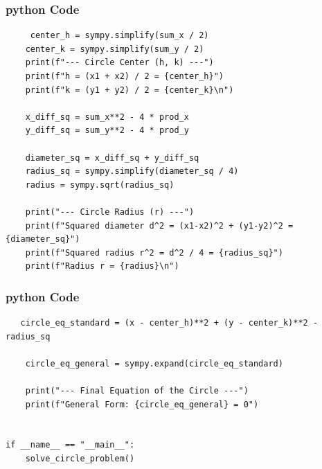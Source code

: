 \documentclass{beamer}
\begin{document}
\begin{frame}[fragile]
    \frametitle{python Code }
    \begin{lstlisting}
     center_h = sympy.simplify(sum_x / 2)
    center_k = sympy.simplify(sum_y / 2)
    print(f"--- Circle Center (h, k) ---")
    print(f"h = (x1 + x2) / 2 = {center_h}")
    print(f"k = (y1 + y2) / 2 = {center_k}\n")
    
    x_diff_sq = sum_x**2 - 4 * prod_x
    y_diff_sq = sum_y**2 - 4 * prod_y
    
    diameter_sq = x_diff_sq + y_diff_sq
    radius_sq = sympy.simplify(diameter_sq / 4)
    radius = sympy.sqrt(radius_sq)

    print("--- Circle Radius (r) ---")
    print(f"Squared diameter d^2 = (x1-x2)^2 + (y1-y2)^2 = {diameter_sq}")
    print(f"Squared radius r^2 = d^2 / 4 = {radius_sq}")
    print(f"Radius r = {radius}\n")

\end{lstlisting}
\end{frame}
\begin{frame}[fragile]
    \frametitle{python Code }
    \begin{lstlisting}
   circle_eq_standard = (x - center_h)**2 + (y - center_k)**2 - radius_sq
    
    circle_eq_general = sympy.expand(circle_eq_standard)

    print("--- Final Equation of the Circle ---")
    print(f"General Form: {circle_eq_general} = 0")


if __name__ == "__main__":
    solve_circle_problem()

\end{lstlisting}
\end{frame}
\end{document}

